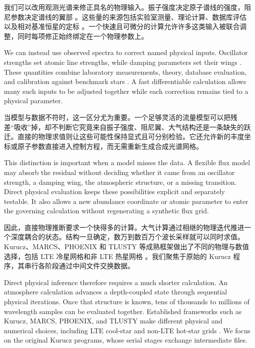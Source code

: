 我们可以改用观测光谱来修正具名的物理输入。振子强度决定原子谱线的强度，阻尼参数决定谱线的翼部 \citep{ValentiPiskunov1996,Gray2005}。这些量的来源包括实验室测量、理论计算、数据库评估以及相对基准恒星的定标 \citep{Piskunov1995,Lobel2011,Jofre2014,Ryabchikova2015,Laverick2019,Smith2021}。一个快速且可微分的计算允许许多这类输入被联合调整，同时每项修正始终绑定在一个物理参数上。

\begin{EN}
We can instead use observed spectra to correct named physical inputs.
Oscillator strengths set atomic line strengths, while damping parameters set
their wings \citep{ValentiPiskunov1996,Gray2005}. These quantities combine
laboratory measurements, theory, database evaluation, and calibration against
benchmark stars
\citep{Piskunov1995,Lobel2011,Jofre2014,Ryabchikova2015,Laverick2019,Smith2021}.
A fast differentiable calculation allows
many such inputs to be adjusted together while each correction remains tied to
a physical parameter.
\end{EN}

当模型与数据不符时，这一区分尤为重要。一个足够灵活的流量模型可以把残差“吸收”掉，却不判断它究竟来自振子强度、阻尼翼、大气结构还是一条缺失的跃迁。直接的物理求值则让这些可能性保持显式且可分别检验。它还允许新的丰度坐标或原子参数直接进入控制方程，而无需重新生成合成光谱网格。

\begin{EN}
This distinction is important when a model misses the data. A flexible flux
model may absorb the residual without deciding whether it came from an
oscillator strength, a damping wing, the atmospheric structure, or a missing
transition. Direct physical evaluation keeps these possibilities explicit and
separately testable. It also allows a new abundance coordinate or atomic
parameter to enter the governing calculation without regenerating a synthetic
flux grid.
\end{EN}

因此，直接物理推断要求一个快得多的计算。大气计算通过相继的物理迭代推进一个深度耦合的状态。结构一旦确定，数万到数百万个波长采样就可以同时求值。Kurucz、MARCS、PHOENIX 和 TLUSTY 等成熟框架做出了不同的物理与数值选择，包括 LTE 冷星网格和非 LTE 热星网格 \citep{HubenyLanz1995,LanzHubeny2003,Kurucz2005,LanzHubeny2007,Gustafsson2008,Husser2013}。我们聚焦于原始的 Kurucz 程序，其串行各阶段通过中间文件交换数据。

\begin{EN}
Direct physical inference therefore requires a much shorter calculation. An
atmosphere calculation advances a depth-coupled state through sequential
physical iterations. Once that structure is known, tens of thousands to millions of
wavelength samples can be evaluated together. Established frameworks such as
Kurucz, MARCS, PHOENIX, and TLUSTY make different physical and numerical
choices, including LTE cool-star and non-LTE hot-star grids
\citep{HubenyLanz1995,LanzHubeny2003,Kurucz2005,LanzHubeny2007,
Gustafsson2008,Husser2013}. We focus on the original Kurucz programs, whose
serial stages exchange intermediate files.
\end{EN}

